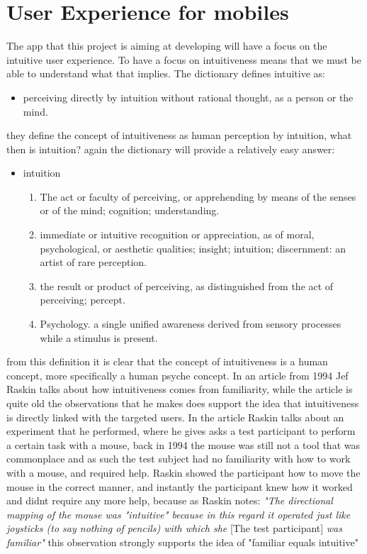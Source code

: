\section{User Experience for mobiles}
The app that this project is aiming at developing will have a focus on the intuitive user experience. To have a focus on intuitiveness means that we must be able to understand what that implies. The dictionary defines intuitive as: 
\begin{itemize}
\item perceiving directly by intuition without rational thought, as a person or the mind.
\end{itemize}
they define the concept of intuitiveness as human perception by intuition, what then is intuition? again the dictionary will provide a relatively easy answer: 
\begin{itemize}
\item intuition\\
\begin{enumerate}
\item The act or faculty of perceiving, or apprehending by means of the senses or of the mind; cognition; understanding.
\item immediate or intuitive recognition or appreciation, as of moral, psychological, or aesthetic qualities; insight; intuition; discernment:
an artist of rare perception.
\item the result or product of perceiving, as distinguished from the act of perceiving; percept.
\item Psychology. a single unified awareness derived from sensory processes while a stimulus is present.
\end{enumerate}
\end{itemize} from this definition it is clear that the concept of intuitiveness is a human concept, more specifically a human psyche concept. In an article from 1994 Jef Raskin\cite{JRaskin} talks about how intuitiveness comes from familiarity, while the article is quite old the observations that he makes does support the idea that intuitiveness is directly linked with the targeted users. In the article Raskin talks about an experiment that he performed, where he gives asks a test participant to perform a certain task with a mouse, back in 1994 the mouse was still not a tool that was commonplace and as such the test subject had no familiarity with how to work with a mouse, and required help. Raskin showed the participant how to move the mouse in the correct manner, and instantly the participant knew how it worked and didnt require any more help, because as Raskin notes: \textit{"The directional mapping of the mouse was "intuitive" because in this regard it operated just like joysticks (to say nothing of pencils) with which she} [The test participant] \textit{was familiar"}\cite{JRaskin} this observation strongly supports the idea of "familiar equals intuitive"



